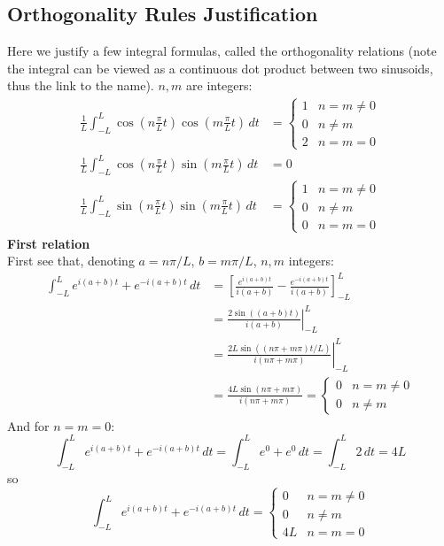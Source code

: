 \documentclass{report}
\begin{document}
\subsection{Orthogonality Rules Justification}
Here we justify a few integral formulas, called the orthogonality relations (note the integral can be viewed
as a continuous dot product between two sinusoids, thus the link to the name). $n,m$ are integers:
\begin{align*}
\frac{1}{L}\int^L_{-L}\cos\left(n\frac{\pi}{L}t\right)\cos\left(m\frac{\pi}{L}t\right)\,dt&=\begin{cases}
1&n=m\neq0\\
0&n\neq m\\
2&n=m=0
\end{cases}\\
\frac{1}{L}\int^L_{-L}\cos\left(n\frac{\pi}{L}t\right)\sin\left(m\frac{\pi}{L}t\right)\,dt&=0\\
\frac{1}{L}\int^L_{-L}\sin\left(n\frac{\pi}{L}t\right)\sin\left(m\frac{\pi}{L}t\right)\,dt&=\begin{cases}
1&n=m\neq0\\
0&n\neq m\\
0&n=m=0
\end{cases}
\end{align*}
\textbf{First relation}\\
First see that, denoting $a=n\pi/L$, $b=m\pi/L$, $n,m$ integers:
\begin{align*}
\int^L_{-L}e^{i(a+b)t}+e^{-i(a+b)t}\,dt&=\left[\frac{e^{i(a+b)t}}{i(a+b)}-\frac{e^{-i(a+b)t}}{i(a+b)}\right]^L_{-L}\\
&=\left.\frac{2\sin((a+b)t)}{i(a+b)}\right|^L_{-L}\\
&=\left.\frac{2L\sin((n\pi+m\pi)t/L)}{i(n\pi+m\pi)}\right|^L_{-L}\\
&=\frac{4L\sin(n\pi+m\pi)}{i(n\pi+m\pi)}=\begin{cases}
0&n=m\neq0\\
0&n\neq m
\end{cases}
\end{align*}
And for $n=m=0$:
\begin{equation*}
\int^L_{-L}e^{i(a+b)t}+e^{-i(a+b)t}\,dt=\int^L_{-L}e^{0}+e^{0}\,dt=\int^L_{-L}2\,dt=4L
\end{equation*}
so
\begin{equation*}
\int^L_{-L}e^{i(a+b)t}+e^{-i(a+b)t}\,dt=\begin{cases}
0&n=m\neq0\\
0&n\neq m\\
4L&n=m=0
\end{cases}
\end{equation*}
\end{document}
